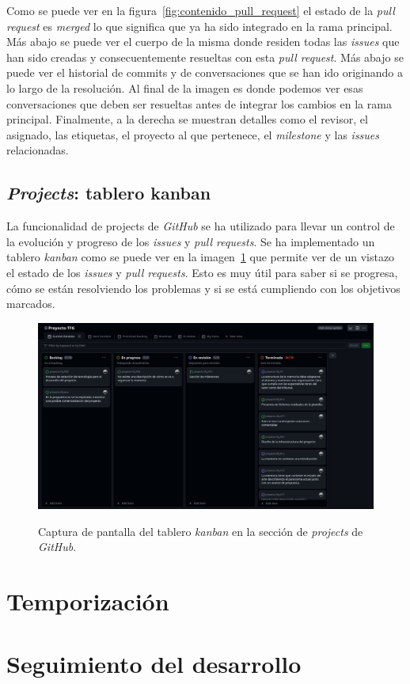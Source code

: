 Como se puede ver en la figura~\ref{fig:contenido_pull_request} el estado de la \textit{pull request} es \textit{merged} lo que significa que ya ha sido integrado en la rama principal. Más abajo se puede ver el cuerpo de la misma donde residen todas las \textit{issues} que han sido creadas y consecuentemente resueltas con esta \textit{pull request}. Más abajo se puede ver el historial de commits y de conversaciones que se han ido originando a lo largo de la resolución. Al final de la imagen es donde podemos ver esas conversaciones que deben ser resueltas antes de integrar los cambios en la rama principal. Finalmente, a la derecha se muestran detalles como el revisor, el asignado, las etiquetas, el proyecto al que pertenece, el \textit{milestone} y las \textit{issues} relacionadas.

\subsection{\textit{Projects}: tablero kanban}

La funcionalidad de projects de \textit{GitHub} se ha utilizado para llevar un control de la evolución y progreso de los \textit{issues} y \textit{pull requests}. Se ha implementado un tablero \textit{kanban} como se puede ver en la imagen~\ref{fig:tablero_kanban} que permite ver de un vistazo el estado de los \textit{issues} y \textit{pull requests}. Esto es muy útil para saber si se progresa, cómo se están resolviendo los problemas y si se está cumpliendo con los objetivos marcados.

\begin{figure}[H]
    \caption{Captura de pantalla del tablero \textit{kanban} en la sección de \textit{projects} de \textit{GitHub}.}
    \centering
    \vspace*{0.5cm}
    \includegraphics[scale=0.2]{figuras/projects_github.png}\label{fig:tablero_kanban}
\end{figure}

\section{Temporización}

\section{Seguimiento del desarrollo}